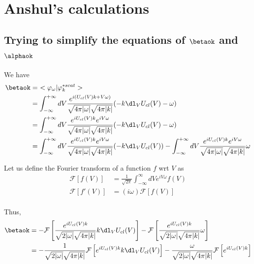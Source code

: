 \section{Anshul's calculations}
\subsection{Trying to simplify the equations of $\betaok$ and $\alphaok$}
We have 
\begin{eqnarray*}
    \betaok &=~ <\varphi_{\omega}|\varphi^{*scat}_k> \\
    &=\int_{-\infty}^{+\infty} dV \frac{e^{i(U_{cl}(V)k+V\omega)}}{\sqrt{4\pi|\omega|}\sqrt{4\pi |k|}}(-k\dl_V U_{cl}(V)-\omega)\\
    &=\int_{-\infty}^{+\infty} dV \frac{e^{iU_{cl}(V)k} e^{iV\omega}}{\sqrt{4\pi|\omega|}\sqrt{4\pi |k|}}(-k\dl_V U_{cl}(V)-\omega)\\
    &=\int_{-\infty}^{+\infty} dV \frac{e^{iU_{cl}(V)k} e^{iV\omega}}{\sqrt{4\pi|\omega|}\sqrt{4\pi |k|}}(-k\dl_V U_{cl}(V)) - \int_{-\infty}^{+\infty} dV \frac{e^{iU_{cl}(V)k} e^{iV\omega}}{\sqrt{4\pi|\omega|}\sqrt{4\pi |k|}}\omega \\
\end{eqnarray*}

Let us define the Fourier transform of a function $f$ wrt $V$ as 
\begin{eqnarray*}
    \mathcal{F} [f(V)] &= \frac{1}{\sqrt{2\pi}}\int_{-\infty}^{\infty} dV e^{iV\omega} f(V) \\ 
    \mathcal{F}[f'(V)] &= (i\omega) \mathcal{F}[f(V)] \\ 
\end{eqnarray*}

\noindent Thus,
\begin{eqnarray*}
    \betaok &= -\mathcal{F} \left[ \frac{e^{iU_{cl}(V)k}}{\sqrt{2|\omega|}\sqrt{4\pi |k|}} k\dl_V U_{cl}(V)\right] - \mathcal{F} \left[ \frac{e^{iU_{cl}(V)k}}{\sqrt{2|\omega|}\sqrt{4\pi |k|}} \omega\right] \\
    &= -\frac{1}{\sqrt{2|\omega|}\sqrt{4\pi |k|}} \mathcal{F}\left[ e^{iU_{cl}(V)k} k\dl_V U_{cl}(V) \right] - \frac{\omega}{\sqrt{2|\omega|}\sqrt{4\pi |k|}} \mathcal{F}\left[ e^{iU_{cl}(V)k} \right] \\
\end{eqnarray*}

